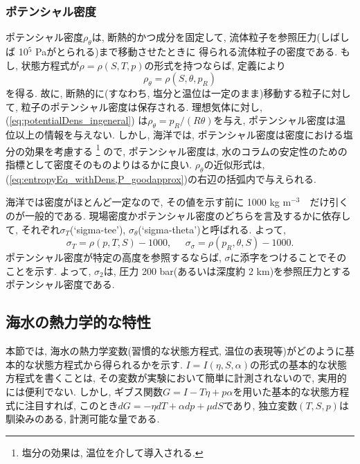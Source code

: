 \subsubsection*{ポテンシャル密度}
ポテンシャル密度$\rho_\theta$は, 断熱的かつ成分を固定して, 流体粒子を参照圧力(しばしば 10$^5$ Paがとられる)まで移動させたときに
得られる流体粒子の密度である. 
もし, 状態方程式が$\rho=\rho(S,T,p)$の形式を持つならば, 定義により
\begin{equation}
 \rho_\theta = \rho(S,\theta, p_R)
 \label{eq:potentialDens_ingeneral}
\end{equation}
を得る. 
故に, 断熱的に(すなわち, 塩分と温位は一定のまま)移動する粒子に対して, 粒子のポテンシャル密度は保存される. 
理想気体に対し, (\ref{eq:potentialDens_ingeneral}) は$\rho_\theta = p_R/(R\theta)$を与え, 
ポテンシャル密度は温位以上の情報を与えない. 
しかし, 海洋では, ポテンシャル密度は密度における塩分の効果を考慮する%
\footnote{
塩分の効果は, 温位を介して導入される. 
}
ので, ポテンシャル密度は, 
水のコラムの安定性のための指標として密度そのものよりはるかに良い. 
$\rho_\theta$の近似形式は, (\ref{eq:entropyEq_withDens,P_goodapprox})の右辺の括弧内で与えられる. 
 
海洋では密度がほとんど一定なので, 
その値を示す前に 1000 kg m$^{-3}$　だけ引くのが一般的である. 
現場密度かポテンシャル密度のどちらを言及するかに依存して, 
それぞれ$\sigma_T$(`sigma-tee'), $\sigma_\theta$(`sigma-theta')と呼ばれる. 
よって, 
\begin{equation}
 \sigma_T = \rho(p,T,S) - 1000, \;\;\;\;\;
 \sigma_\sigma = \rho(p_R,\theta,S) - 1000. 
\end{equation}
ポテンシャル密度が特定の高度を参照するならば, $\sigma$に添字をつけることでそのことを示す. 
よって, $\sigma_2$は, 圧力 200 bar(あるいは深度約 2 km)を参照圧力とするポテンシャル密度である. 

\subsection{海水の熱力学的な特性}
本節では, 海水の熱力学変数(習慣的な状態方程式, 温位の表現等)がどのように基本的な状態方程式から得られるかを示す. 
$I=I(\eta,S,\alpha)$の形式の基本的な状態方程式を書くことは, その変数が実験において簡単に計測されないので, 
実用的には便利でない. 
しかし, ギブス関数$G=I - T\eta + p\alpha$を用いた基本的な状態方程式に注目すれば, 
このとき$dG = -\eta dT + \alpha dp + \mu dS$であり, 
独立変数$(T,S,p)$は馴染みのある, 計測可能な量である. 

